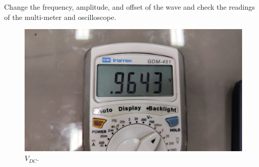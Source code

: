 \documentclass[11pt]{article}
\newcommand{\PicScale}{0.2}
\begin{document}
\begin{question}
\begin{subquestion}{Change the frequency, amplitude, and offset of the wave and check the readings of the multi-meter and oscilloscope.}
{            \begin{figure}[H]
                \begin{center}
                    \includegraphics[scale=\PicScale]{Fig/26.jpeg}
                    \caption{$V_{DC}$.}
                \end{center}
            \end{figure}

}
\end{subquestion}
\end{question}
\end{document}
